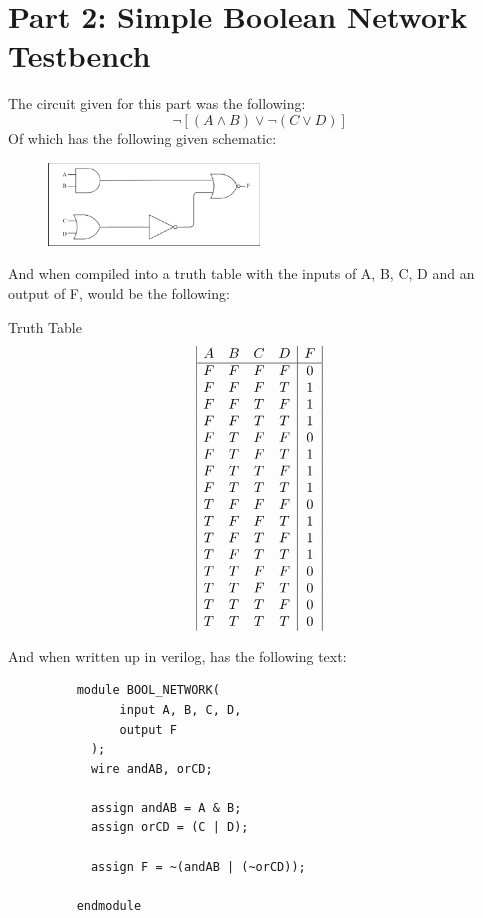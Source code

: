\section{Part 2: Simple Boolean Network Testbench}
The circuit given for this part was the following:
$$ \neg[(A \land B) \lor \neg (C \lor D)] $$
Of which has the following given schematic:
\begin{figure}[!htbp]
    \centering
    \caption{}
    \includegraphics[width=0.5\textwidth]{part-2-schem.png}
    \label{Figure 1}
\end{figure}\newpage
And when compiled into a truth table with the inputs of A, B, C, D and an output of F, would be the following:
\begin{center}
    Truth Table
    \begin{displaymath}
    \begin{array}{| c  c  c  c |c|}
    A & B & C & D & F\\
    \hline
    F & F & F & F & 0 \\
    F & F & F & T & 1 \\
    F & F & T & F & 1 \\
    F & F & T & T & 1 \\
    F & T & F & F & 0 \\
    F & T & F & T & 1 \\
    F & T & T & F & 1 \\
    F & T & T & T & 1 \\
    T & F & F & F & 0 \\
    T & F & F & T & 1 \\
    T & F & T & F & 1 \\
    T & F & T & T & 1 \\
    T & T & F & F & 0 \\
    T & T & F & T & 0 \\
    T & T & T & F & 0 \\
    T & T & T & T & 0 \\
    \end{array}
    \end{displaymath}
\end{center}
And when written up in verilog, has the following text:
\begin{figure}[!htbp]
    \centering
    \begin{verbatim}
    module BOOL_NETWORK(
          input A, B, C, D,
          output F
      );
      wire andAB, orCD;

      assign andAB = A & B;
      assign orCD = (C | D);

      assign F = ~(andAB | (~orCD));
      
    endmodule
    \end{verbatim}
\end{figure}\newpage
